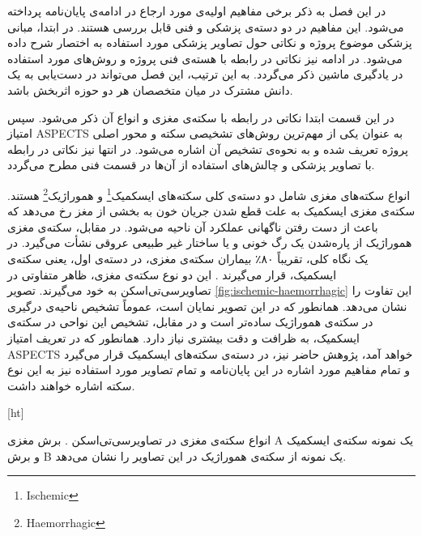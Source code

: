 

در این فصل به ذکر برخی مفاهیم اولیه‌ی مورد ارجاع در ادامه‌ی پایان‌نامه پرداخته می‌شود.
این مفاهیم در دو دسته‌ی پزشکی و فنی قابل بررسی هستند.
در ابتدا، مبانی پزشکی موضوع پروژه و نکاتی حول تصاویر پزشکی مورد استفاده به اختصار شرح داده می‌شود.
در ادامه نیز نکاتی در رابطه با هسته‌ی فنی پروژه و روش‌های مورد استفاده در یادگیری ماشین ذکر می‌گردد.
به این ترتیب، این فصل می‌تواند در دست‌یابی به یک دانش مشترک در میان متخصصان هر دو حوزه اثربخش باشد.


در این قسمت ابتدا نکاتی در رابطه با سکته‌ی مغزی و انواع آن ذکر می‌شود.
سپس امتیاز ASPECTS به عنوان یکی از مهم‌ترین روش‌های تشخیصی سکته و محور اصلی پروژه تعریف شده و
به نحوه‌ی تشخیص آن اشاره می‌شود.
در انتها نیز نکاتی در رابطه با تصاویر پزشکی و چالش‌های استفاده از آن‌ها در قسمت فنی مطرح می‌گردد.


انواع سکته‌های مغزی شامل دو دسته‌ی کلی سکته‌های 
ایسکمیک\footnote{Ischemic}
و 
هموراژیک\footnote{Haemorrhagic} 
هستند.
سکته‌ی مغزی ایسکمیک به علت قطع شدن جریان خون به بخشی از مغز رخ می‌دهد که باعث از دست رفتن ناگهانی عملکرد آن ناحیه می‌شود.
در مقابل، سکته‌ی مغزی هموراژیک از پاره‌شدن یک رگ خونی و یا ساختار غیر طبیعی عروقی نشأت می‌گیرد.
در یک نگاه کلی، تقریباً ۸۰٪ بیماران سکته‌ی مغزی، در دسته‌ی اول، یعنی سکته‌ی ایسکمیک، قرار می‌گیرند \cite{donkor2018stroke}.
این دو نوع سکته‌ی مغزی، ظاهر متفاوتی در تصاویرسی‌تی‌اسکن به خود می‌گیرند.
تصویر 
\ref{fig:ischemic-haemorrhagic}
 این تفاوت را نشان می‌دهد.
همانطور که در این تصویر نمایان است، عموماً تشخیص ناحیه‌ی درگیری
در سکته‌ی هموراژیک ساده‌تر است و در مقابل، تشخیص این نواحی در سکته‌ی ایسکمیک، به ظرافت و دقت بیشتری نیاز دارد.
همانطور که در تعریف امتیاز ASPECTS خواهد آمد، پژوهش حاضر نیز، در دسته‌ی 
سکته‌های ایسکمیک قرار می‌گیرد و تمام مفاهیم مورد اشاره در این پایان‌نامه و تمام تصاویر مورد استفاده نیز به این نوع سکته اشاره خواهند داشت.


[ht]
\caption[انواع سکته‌ی مغزی]{انواع سکته‌ی مغزی در تصاویرسی‌تی‌اسکن \cite{le2018ischemic}. برش مغزی A یک نمونه سکته‌ی ایسکمیک و برش B یک نمونه از سکته‌ی هموراژیک در این تصاویر را نشان می‌دهد.}

